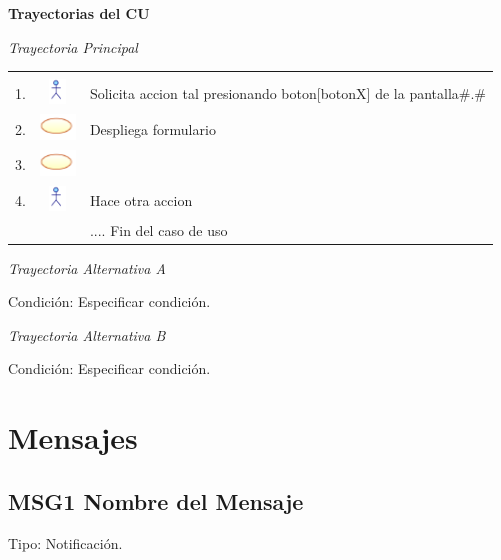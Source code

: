 \documentclass[10pt,spanish]{article}
\providecommand{\tabularnewline}{\\}
\begin{document}
	\textbf{\large Trayectorias del CU}{\large \par}

	\textit{\large Trayectoria Principal}{\large{} }{\large \par}

	\begin{tabular}{ccl}
	 &  & \tabularnewline
	1. & \includegraphics{actor} & Solicita accion tal presionando boton{[}botonX{]} de la pantalla\#.\#\tabularnewline
	2. & \includegraphics{sistema} & Despliega formulario\tabularnewline
	3. & \includegraphics{sistema} & \tabularnewline
	4. & \includegraphics{actor} & Hace otra accion\tabularnewline
	 &  & .... Fin del caso de uso\tabularnewline
	\end{tabular}

	\textit{Trayectoria Alternativa A} 

	Condición: Especificar condición.

	\newpage{}\textit{Trayectoria Alternativa B} 

	Condición: Especificar condición.


	\section{Mensajes}


	\subsection{MSG1 Nombre del Mensaje}

	\begin{flushleft}
	Tipo: Notificación.
	\par\end{flushleft}
\end{document}
